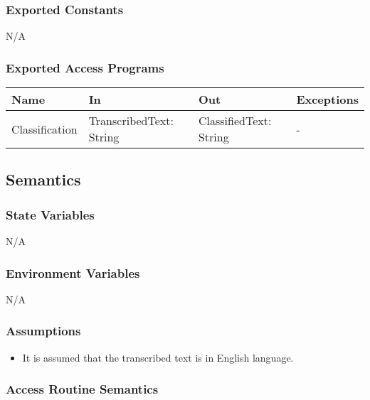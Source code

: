 \documentclass[12pt, titlepage]{article}
\begin{document}
\subsubsection{Exported Constants}

N/A

\subsubsection{Exported Access Programs}

\begin{center}
  \begin{tabular}{p{2.5cm} p{4cm} p{4cm} p{3cm}}  %
  \hline
  \textbf{Name} & \textbf{In} & \textbf{Out} & \textbf{Exceptions} \\
  \hline
  Classification & TranscribedText: String & ClassifiedText: String & - & \\
  \hline
  \end{tabular}
  \end{center}

\subsection{Semantics}

\subsubsection{State Variables}

N/A

\subsubsection{Environment Variables}

N/A

\subsubsection{Assumptions}

\begin{itemize}
  \item It is assumed that the transcribed text is in English language.
\end{itemize}

\subsubsection{Access Routine Semantics}
\end{document}
